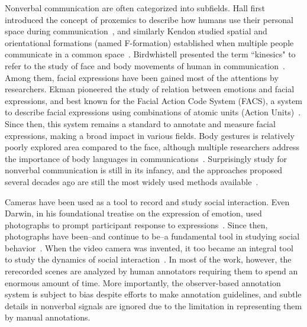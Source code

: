 Nonverbal communication are often categorized into subfields. Hall first introduced the concept of proxemics to describe how humans use their personal space during communication~\cite{Hall66}, and similarly Kendon studied spatial and orientational formations (named F-formation) established when multiple people communicate in a common space~\cite{kendon90}. Birdwhistell presented the term ``kinesics" to refer to the study of face and body movements of human in communication~\cite{Birdwhistell52, ekman1969}. Among them, facial expressions have been gained most of the attentions by researchers. Ekman pioneered the study of relation between emotions and facial expressions, and best known for the Facial Action Code System (FACS), a system to describe facial expressions using combinations of atomic units (Action Units)~\cite{ekman1977facial}. Since then, this system remains a standard to annotate and measure facial expressions, making a broad impact in various fields. Body gestures is relatively poorly explored area compared to the face, although multiple researchers address the importance of body languages in communications~\cite{Gelder09, Moore13, Meeren-2005, Aviezer-2012}. Surprisingly study for nonverbal communication is still in its infancy, and the approaches proposed several decades ago are still the most widely used methods available~\cite{Moore13}. 

Cameras have been used as a tool to record and study social interaction. Even Darwin, in his foundational treatise on the expression of emotion, used photographs to prompt participant response to expressions~\cite{Darwin-1872}. Since then, photographs have been--and continue to be--a fundamental tool in studying social behavior~\cite{Hall-1962,Izard-1971,Ekman-1977}. When the video camera was invented, it too became an integral tool to study the dynamics of social interaction~\cite{Muybridge-1887,Yarbus-1967}. In most of the work, however, the rerecorded scenes are analyzed by human annotators requiring them to spend an enormous amount of time. More importantly, the observer-based annotation system is subject to bias despite efforts to make annotation guidelines, and subtle details in nonverbal signals are ignored due to the limitation in representing them by manual annotations. 


